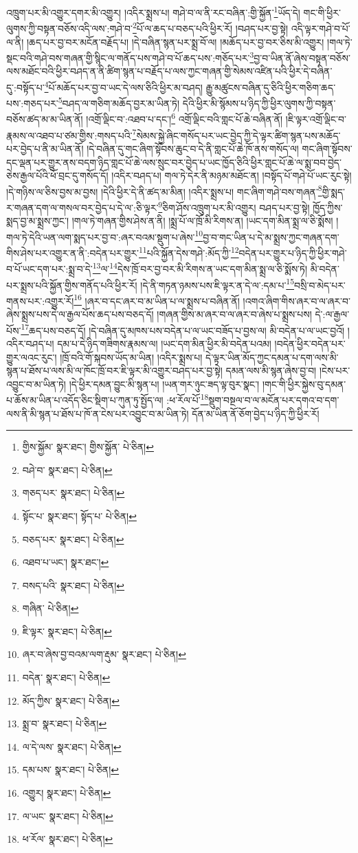 འཁྲུག་པར་མི་འགྱུར་དགར་མི་འགྱུར། །འདིར་སྨྲས་པ། གཤེ་བ་ལ་ནི་རང་བཞིན་:གྱི་སྐྱོན་\footnote{གྱིས་སྐྱོམ་  སྣར་ཐང་། གྱིས་སྐྱོན་  པེ་ཅིན། }ཡོད་དེ། གང་གི་ཕྱིར་ལུགས་ཀྱི་བསྟན་བཅོས་འདི་ལས་:གཤེ་བ་\footnote{བཤེ་བ་  སྣར་ཐང་།  པེ་ཅིན། }པོ་ལ་ཆད་པ་བཅད་པའི་ཕྱིར་རོ། །བཤད་པར་བྱ་སྟེ། འདི་ལྟར་གཤེ་བ་པོ་ལ་ནི། །ཆད་པར་བྱ་བར་མངོན་བརྗོད་པ། །དེ་བཞིན་སྙན་པར་སྨྲ་བོ་ལ། །མཆོད་པར་བྱ་བར་ཅིས་མི་འགྱུར། །གལ་ཏེ་སྡང་བའི་གཤེ་བས་གཞན་གྱི་སྙིང་ལ་གནོད་པས་གཤེ་བ་པོ་ཆད་པས་:གཅོད་པར་\footnote{གཅད་པར་  སྣར་ཐང་།  པེ་ཅིན། }བྱ་བ་ཡིན་ནོ་ཞེས་བསྟན་བཅོས་ལས་མཐོང་བའི་ཕྱིར་བཤད་ན་ནི་ཚིག་སྙན་པ་བརྗོད་པ་ལས་ཀྱང་གཞན་གྱི་སེམས་འཛིན་པའི་ཕྱིར་དེ་བཞིན་དུ་:བསྟོད་པ་\footnote{སྟོང་པ་  སྣར་ཐང་། སྟོད་པ་  པེ་ཅིན། }པོ་མཆོད་པར་བྱ་བ་ཡང་དེ་ལས་ཅིའི་ཕྱིར་མ་བཤད། རྒྱུ་མཚུངས་བཞིན་དུ་ཅིའི་ཕྱིར་གཅིག་ཆད་པས་:གཅད་པར་\footnote{བཅད་པར་  སྣར་ཐང་།  པེ་ཅིན། }བཤད་ལ་གཅིག་མཆོད་བྱར་མ་ཡིན་ཏེ། དེའི་ཕྱིར་མི་སྙོམས་པ་ཉིད་ཀྱི་ཕྱིར་ལུགས་ཀྱི་བསྟན་བཅོས་ཚད་མ་མ་ཡིན་ནོ། །འགྲོ་ལྡིང་བ་:འཐབ་པ་དང་།\footnote{འཐབ་པ་ཡང་།  སྣར་ཐང་། } འགྲོ་ལྡིང་བའི་གླང་པོ་ཆེ་བཞིན་ནོ། །ཇི་ལྟར་འགྲོ་ལྡིང་བ་རྣམས་ལ་འཐབ་པ་ཙམ་གྱིས་:གསད་པའི་\footnote{བསད་པའི་  སྣར་ཐང་།  པེ་ཅིན། }སེམས་སྐྱེ་ཞིང་གསོད་པར་ཡང་བྱེད་ཀྱི་དེ་ལྟར་ཚིག་སྙན་པས་མཆོད་པར་བྱེད་པ་ནི་མ་ཡིན་ནོ། །དེ་བཞིན་དུ་གང་ཞིག་སྟོབས་ཆུང་བ་དེ་ནི་གླང་པོ་ཆེ་ཁོ་ནས་གསོད་ལ། གང་ཞིག་སྟོབས་དང་ལྡན་པར་གྱུར་ནས་བདག་ཉིད་གླང་པོ་ཆེ་ལས་སྲུང་བར་བྱེད་པ་ཡང་ཁྱོད་ཅིའི་ཕྱིར་གླང་པོ་ཆེ་ལ་སྨ་བབ་བྱེད་ཅེས་རྒྱལ་པོའི་ཕོ་བྲང་དུ་གསོད་དོ། །འདིར་བཤད་པ། གལ་ཏེ་དེར་ནི་མཉམ་མཐོང་ན། །བསྟོད་པོ་གཤེ་པོ་ཡང་རུང་སྟེ། །དེ་གཉིས་ལ་ཅིས་བྱས་མ་བྱས། །དེའི་ཕྱིར་དེ་ནི་ཚད་མ་མིན། །འདིར་སྨྲས་པ། གང་ཞིག་གཤེ་བས་གཞན་\footnote{གཞིན་  པེ་ཅིན། }གྱི་སྨད་ར་གཞན་དག་ལ་གསལ་བར་བྱེད་པ་དེ་ལ་:ཅི་ལྟར་\footnote{ཇི་ལྟར་  སྣར་ཐང་།  པེ་ཅིན། }ཅིག་ཤོས་འཁྲུག་པར་མི་འགྱུར། བཤད་པར་བྱ་སྟེ། ཁྱོད་ཀྱིས་སྨད་བྱ་མ་སྨྲས་ཀྱང་། །གལ་ཏེ་གཞན་གྱིས་ཤེས་ན་ནི། །སྨྲ་པོ་ལ་ཁྲོ་མི་རིགས་ན། །ཡང་དག་མིན་སྨྲ་ལ་ཅི་སྨོས། །གལ་ཏེ་དེའི་ཡན་ལག་སྨད་པར་བྱ་བ་:ཞར་བའམ་སྡུག་པ་ཞེས་\footnote{ཞར་བ་ཞེས་བྱ་བའམ་ལག་རྡུམ་  སྣར་ཐང་།  པེ་ཅིན། }བྱ་བ་གང་ཡིན་པ་དེ་མ་སྨྲས་ཀྱང་གཞན་དག་གིས་ཤེས་པར་འགྱུར་ན་ནི་:བདེན་པར་གྱུར་\footnote{བདེན་  སྣར་ཐང་།  པེ་ཅིན། }པའི་སྐྱོན་དེས་གཤེ་:མོད་ཀྱི་\footnote{མོད་ཀྱིས་  སྣར་ཐང་།  པེ་ཅིན། }བདེན་པར་གྱུར་པ་ཉིད་ཀྱི་ཕྱིར་གཤེ་བ་པོ་ཡང་དག་པར་:སྨྲ་བ་དེ་\footnote{སྨྲ་བ་  སྣར་ཐང་།  པེ་ཅིན། }ལ་\footnote{ལ་དེ་ལས་  སྣར་ཐང་།  པེ་ཅིན། }དེས་ཁྲོ་བར་བྱ་བར་མི་རིགས་ན་ཡང་དག་མིན་སྨྲ་ལ་ཅི་སྨོས་ཏེ། མི་བདེན་པར་སྨྲས་པའི་སྐྱོན་གྱིས་གནོད་པའི་ཕྱིར་རོ། །དེ་ནི་གཏན་ཉམས་པས་ཇི་ལྟར་ན་དེ་ལ་:དམ་པ་\footnote{དམ་པས་  སྣར་ཐང་།  པེ་ཅིན། }བསྲི་བ་མེད་པར་གནས་པར་:འགྱུར་རོ།\footnote{འགྱུར།  སྣར་ཐང་།  པེ་ཅིན། } །ཞར་བ་དང་ཞར་བ་མ་ཡིན་པ་ལ་སྨྲས་པ་བཞིན་ནོ། །འགའ་ཞིག་གིས་ཞར་བ་ལ་ཞར་བ་ཞེས་སྨྲས་པས་དེ་ལ་རྒྱལ་པོས་ཆད་པས་བཅད་དོ། །གཞན་གྱིས་མ་ཞར་བ་ལ་ཞར་བ་ཞེས་པ་སྨྲས་པས། དེ་:ལ་རྒྱལ་པོས་\footnote{ལ་ཡང་  སྣར་ཐང་།  པེ་ཅིན། }ཆད་པས་བཅད་དོ། །དེ་བཞིན་དུ་མཁས་པས་བདེན་པ་ལ་ཡང་བཟོད་པ་བྱས་ལ། མི་བདེན་པ་ལ་ཡང་བྱའོ། །འདིར་བཤད་པ། དམ་པ་དེ་ཉིད་གཟིགས་རྣམས་ལ། །ཡང་དག་མིན་ཕྱིར་མི་བདེན་པའམ། །བདེན་ཕྱིར་བདེན་པར་གྱུར་ལའང་རུང་། །ཁྲོ་བའི་གོ་སྐབས་ཡོད་མ་ཡིན། །འདིར་སྨྲས་པ། དེ་ལྟར་ཡིན་མོད་ཀྱང་དམན་པ་དག་ལས་མི་སྙན་པ་ཐོས་པ་ལས་མི་ལ་ཁོང་ཁྲོ་བར་ཇི་ལྟར་མི་འགྱུར་བཤད་པར་བྱ་སྟེ། དམན་ལས་མི་སྙན་ཞེས་བྱ་བ། །ངེས་པར་འབྱུང་བ་མ་ཡིན་ཏེ། །དེ་ཕྱིར་དམན་བྱུང་མི་སྙན་པ། །ཡན་གར་ཉུང་ཟད་ལྟ་བུར་སྣང་། །གང་གི་ཕྱིར་སྐྱེས་བུ་དམན་པ་ཆོས་མ་ཡིན་པ་འདོད་ཅིང་སྡིག་པ་ཀུན་ཏུ་སྤྱོད་ལ། :ཕ་རོལ་པོ་\footnote{ཕ་རོལ་  སྣར་ཐང་།  པེ་ཅིན། }སྡུག་བསྔལ་བ་ལ་མངོན་པར་དགའ་བ་དག་ལས་ནི་མི་སྙན་པ་ཐོས་པ་ཁོ་ན་ངེས་པར་འབྱུང་བ་མ་ཡིན་ཏེ། དོན་མ་ཡིན་ནོ་ཅོག་བྱེད་པ་ཉིད་ཀྱི་ཕྱིར་རོ། 